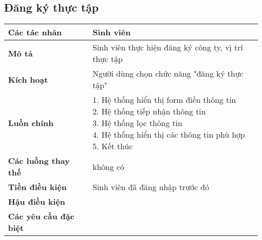 	\subsection*{Đăng ký thực tập}
	\begin{tabular}{|l|l|}
		\hline
		\textbf{Các tác nhân}         & Sinh viên                                             \\
		\hline
		\textbf{Mô tả}                & Sinh viên thực hiện đăng ký công ty, vị trí thực tập  \\
		\hline
		\textbf{Kích hoạt}            & Người dùng chọn chức năng "đăng ký thực tập"          \\
		\hline
		\textbf{Luồn chính}           & \makecell[l]{1. Hệ thống hiển thị form điền thông tin \\ 2. Hệ thống tiếp nhận thông tin \\ 3. Hệ thống lọc thông tin \\ 4. Hệ thống hiển thị các thông tin phù hợp \\ 5. Kết thúc} \\
		\hline
		\textbf{Các luồng thay thế}   & không có                                              \\
		\hline
		\textbf{Tiền điều kiện}       & Sinh viên đã đăng nhập trước đó                       \\
		\hline
		\textbf{Hậu điều kiện}        &                                                       \\
		\hline
		\textbf{Các yêu cầu đặc biệt} &                                                       \\
		\hline
	\end{tabular}

